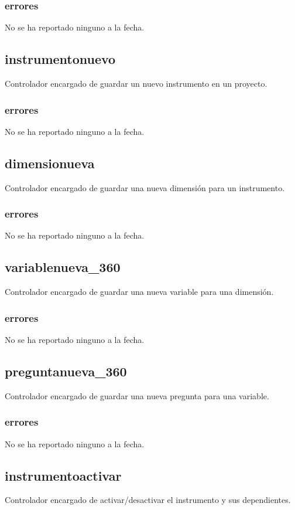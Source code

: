 \documentclass[10pt,a4paper]{book}
\begin{document}
	\subsubsection{errores}
	No se ha reportado ninguno a la fecha.
	
	\subsection{instrumentonuevo}
	Controlador encargado de guardar un nuevo instrumento en un proyecto.
	\subsubsection{errores}
	No se ha reportado ninguno a la fecha.
	
	\subsection{dimensionueva}
	Controlador encargado de guardar una nueva dimensión para un instrumento. 
	\subsubsection{errores}
	No se ha reportado ninguno a la fecha.
	
	\subsection{variablenueva\_360}
	Controlador encargado de guardar una nueva variable para una dimensión.
	\subsubsection{errores}
	No se ha reportado ninguno a la fecha.
	
	\subsection{preguntanueva\_360}
	Controlador encargado de guardar una nueva pregunta para una variable.
	\subsubsection{errores}
	No se ha reportado ninguno a la fecha.
	
	\subsection{instrumentoactivar}
	Controlador encargado de activar/desactivar el instrumento y sus dependientes.
\end{document}
